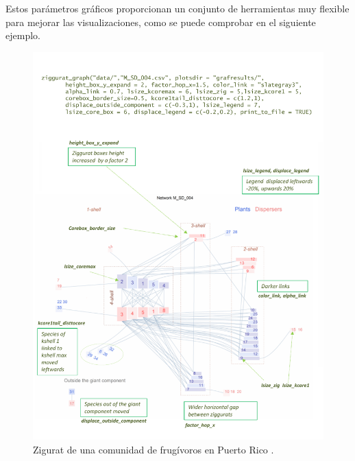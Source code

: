 Estos parámetros gráficos proporcionan un conjunto de herramientas muy flexible para mejorar las visualizaciones, como
se puede comprobar en el siguiente ejemplo.

\clearpage
\begin{figure}[hbt!]
\centering
\includegraphics[scale=0.8]{ManFigs/M_SD_004_ziggurat_improved.pdf}
\caption{Zigurat de una comunidad de frugívoros en Puerto Rico \cite{carlo2003avian}.}
\label{fig:M_SD_004_ziggurat_improved}
\end{figure}

